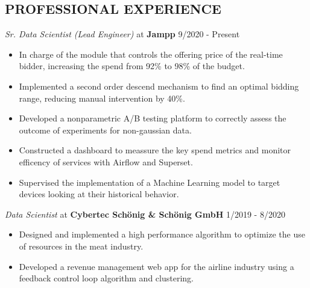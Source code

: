 \documentclass[margin]{res}
\begin{document}
\begin{resume}
    \section{PROFESSIONAL EXPERIENCE} 
    {\sl Sr. Data Scientist (Lead Engineer)} at {\bf Jampp} \hfill 9/2020 - Present
    \begin{itemize}  \itemsep -2pt %
        \item In charge of the module that controls the offering price of the
            real-time bidder, increasing the spend from 92\% to 98\%
            of the budget.
        \item Implemented a second order descend mechanism to find an optimal bidding range,
            reducing manual intervention by 40\%.
        \item Developed a nonparametric A/B testing platform to correctly assess the
            outcome of experiments for non-gaussian data. 
        \item Constructed a dashboard to meassure the key spend metrics and monitor
            efficency of services with Airflow and Superset.
        \item Supervised the implementation of a Machine Learning model to target
            devices looking at their historical behavior.
    \end{itemize} 
    {\sl Data Scientist} at {\bf Cybertec Sch\"onig \& Sch\"onig GmbH} \hfill 1/2019 - 8/2020
    \begin{itemize}  \itemsep -2pt %
        \item Designed and implemented a high performance 
            algorithm to optimize the use of resources in the meat industry.
        \item Developed a revenue management web app for the airline industry 
            using a feedback control loop algorithm and clustering.
    \end{itemize}
		

\end{resume}
\end{document}

